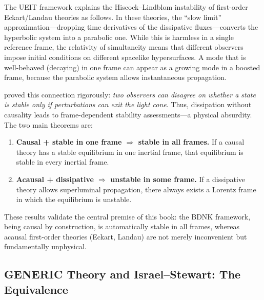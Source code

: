 The UEIT framework explains the Hiscock--Lindblom instability of
first-order Eckart/Landau theories as follows.  In these theories,
the ``slow limit'' approximation---dropping time derivatives of the
dissipative fluxes---converts the hyperbolic system into a parabolic
one.  While this is harmless in a single reference frame, the
relativity of simultaneity means that different observers impose
initial conditions on different spacelike hypersurfaces.  A mode
that is well-behaved (decaying) in one frame can appear as a growing
mode in a boosted frame, because the parabolic system allows
instantaneous propagation.

\citet{GavassinoDissipationCausality2021} proved this connection
rigorously: \emph{two observers can disagree on whether a state is
stable only if perturbations can exit the light cone}.  Thus,
dissipation without causality leads to frame-dependent stability
assessments---a physical absurdity.  The two main theorems are:
\begin{enumerate}
  \item \textbf{Causal + stable in one frame $\Rightarrow$ stable
    in all frames.}  If a causal theory has a stable equilibrium in
    one inertial frame, that equilibrium is stable in every inertial
    frame.
  \item \textbf{Acausal + dissipative $\Rightarrow$ unstable in some
    frame.}  If a dissipative theory allows superluminal propagation,
    there always exists a Lorentz frame in which the equilibrium is
    unstable.
\end{enumerate}
These results validate the central premise of this book: the BDNK
framework, being causal by construction, is automatically stable in
all frames, whereas acausal first-order theories (Eckart, Landau)
are not merely inconvenient but fundamentally unphysical.

\subsection{GENERIC Theory and Israel--Stewart: The Equivalence}
\label{subsec:generic-is-equivalence}

